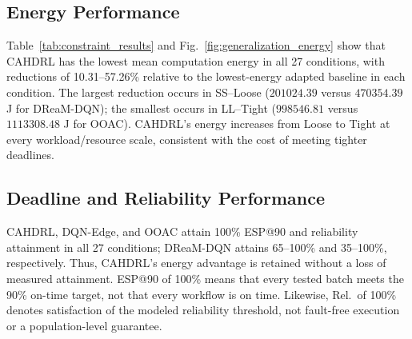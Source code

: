 \documentclass[journal]{IEEEtran}
\begin{document}
\subsection{Energy Performance}
\label{subsec:energy_results}
Table~\ref{tab:constraint_results} and Fig.~\ref{fig:generalization_energy} show that CAHDRL has the lowest mean computation energy in all 27 conditions, with reductions of 10.31--57.26\% relative to the lowest-energy adapted baseline in each condition. The largest reduction occurs in SS--Loose ($201024.39$ versus $470354.39$ J for DReaM-DQN); the smallest occurs in LL--Tight ($998546.81$ versus $1113308.48$ J for OOAC). CAHDRL's energy increases from Loose to Tight at every workload/resource scale, consistent with the cost of meeting tighter deadlines.

\subsection{Deadline and Reliability Performance}
\label{subsec:constraint_results}
CAHDRL, DQN-Edge, and OOAC attain 100\% ESP@90 and reliability attainment in all 27 conditions; DReaM-DQN attains 65--100\% and 35--100\%, respectively. Thus, CAHDRL's energy advantage is retained without a loss of measured attainment. ESP@90 of 100\% means that every tested batch meets the 90\% on-time target, not that every workflow is on time. Likewise, Rel.\ of 100\% denotes satisfaction of the modeled reliability threshold, not fault-free execution or a population-level guarantee.
\end{document}
